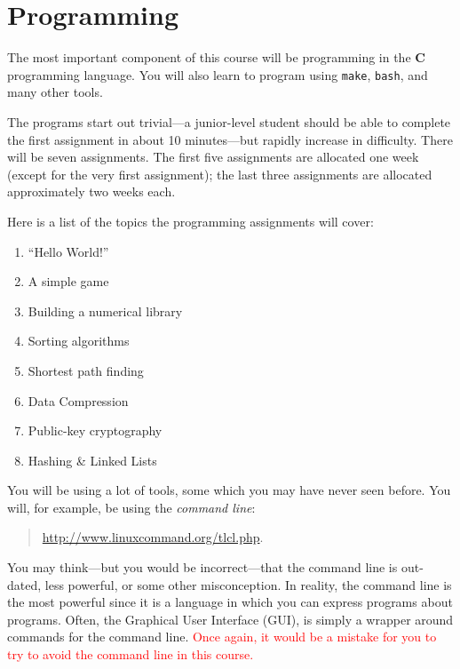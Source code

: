 \documentclass{article}
\begin{document}
\section{Programming}

The most important component of this course will be programming in the
\textbf{C} programming language. You will also learn to program using
\texttt{make}, \texttt{bash}, and many other tools.

The programs start out trivial---a junior-level student should be able
to complete the first assignment in about 10 minutes---but rapidly
increase in difficulty. There will be seven assignments. The first five
assignments are allocated one week (except for the very first
assignment); the last three assignments are allocated approximately two
weeks each.

Here is a list of the topics the programming assignments will cover:

\begin{adjmulticols}{2}{\oddsidemargin}{\oddsidemargin}
\begin{enumerate}[start=0]
  \item ``Hello World!''
  \item A simple game
  \item Building a numerical library
  \item Sorting algorithms
  \item Shortest path finding
  \item Data Compression
  \item Public-key cryptography
  \item Hashing \& Linked Lists
\end{enumerate}
\end{adjmulticols}

You will be using a lot of tools, some which you may have never seen before. You
will, for example, be using the \emph{command line}:
\begin{quotation}
\centerline{\url{http://www.linuxcommand.org/tlcl.php}.}
\end{quotation}
You may think---but you would be incorrect---that the command line is out-dated,
less powerful, or some other misconception. In reality, the command line is the
most powerful since it is a language in which you can express programs about
programs. Often, the Graphical User Interface (GUI), is simply a wrapper around
commands for the command line. \textcolor{red}{Once again, it would be a
mistake for you to try to avoid the command line in this course.}
\end{document}
